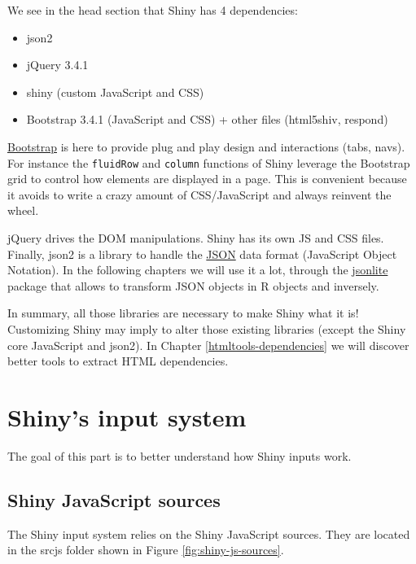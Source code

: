 \documentclass[]{book}
\providecommand{\tightlist}{%
  \setlength{\itemsep}{0pt}\setlength{\parskip}{0pt}}
\begin{document}
We see in the head section that Shiny has 4 dependencies:

\begin{itemize}
\tightlist
\item
  json2
\item
  jQuery 3.4.1
\item
  shiny (custom JavaScript and CSS)
\item
  Bootstrap 3.4.1 (JavaScript and CSS) + other files (html5shiv, respond)
\end{itemize}

\href{https://getbootstrap.com}{Bootstrap} is here to provide plug and play design and interactions (tabs, navs). For instance the \texttt{fluidRow} and \texttt{column} functions of Shiny leverage the Bootstrap grid to control how elements are displayed in a page. This is convenient because it avoids to write a crazy amount of CSS/JavaScript and always reinvent the wheel.

jQuery drives the DOM manipulations. Shiny has its own JS and CSS files. Finally, json2 is a library to handle the \href{https://www.json.org/json-en.html}{JSON} data format (JavaScript Object Notation). In the following chapters we will use it a lot, through the \href{https://cran.r-project.org/web/packages/jsonlite/index.html}{jsonlite} package that allows to transform JSON objects in R objects and inversely.

In summary, all those libraries are necessary to make Shiny what it is! Customizing Shiny may imply to alter those existing libraries (except the Shiny core JavaScript and json2). In Chapter \ref{htmltools-dependencies} we will discover better tools to extract HTML dependencies.

\hypertarget{shinys-input-system}{%
\section{Shiny's input system}\label{shinys-input-system}}

The goal of this part is to better understand how Shiny inputs work.

\hypertarget{shiny-javascript-sources}{%
\subsection{Shiny JavaScript sources}\label{shiny-javascript-sources}}

The Shiny input system relies on the Shiny JavaScript sources. They are located in the srcjs folder shown in Figure \ref{fig:shiny-js-sources}.
\end{document}
